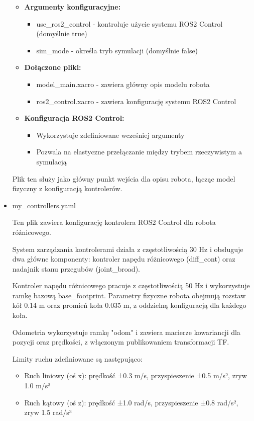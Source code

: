 \documentclass[a4paper,twoside,12pt]{book}
\begin{document}
\begin{itemize}
\begin{itemize}
	\item \textbf{Argumenty konfiguracyjne:}
		\begin{itemize}
		\item use\_ros2\_control - kontroluje użycie systemu ROS2 Control (domyślnie true)
		\item sim\_mode - określa tryb symulacji (domyślnie false)
		\end{itemize}

	\item \textbf{Dołączone pliki:}
		\begin{itemize}
		\item model\_main.xacro - zawiera główny opis modelu robota
		\item ros2\_control.xacro - zawiera konfigurację systemu ROS2 Control
		\end{itemize}

	\item \textbf{Konfiguracja ROS2 Control:}
		\begin{itemize}
		\item Wykorzystuje zdefiniowane wcześniej argumenty
		\item Pozwala na elastyczne przełączanie między trybem rzeczywistym a symulacją
		\end{itemize}
	\end{itemize}

	Plik ten służy jako główny punkt wejścia dla opisu robota, łącząc model fizyczny z konfiguracją kontrolerów.
	\newpage
	\item my\_controllers.yaml
	
	Ten plik zawiera konfigurację kontrolera ROS2 Control dla robota różnicowego. 
	
	System zarządzania kontrolerami działa z częstotliwością 30 Hz i obsługuje dwa główne komponenty: kontroler napędu różnicowego (diff\_cont) oraz nadajnik stanu przegubów (joint\_broad).

	Kontroler napędu różnicowego pracuje z częstotliwością 50 Hz i wykorzystuje ramkę bazową base\_footprint. Parametry fizyczne robota obejmują rozstaw kół 0.14 m oraz promień koła 0.035 m, z oddzielną konfiguracją dla każdego koła.

	Odometria wykorzystuje ramkę "odom" i zawiera macierze kowariancji dla pozycji oraz prędkości, z włączonym publikowaniem transformacji TF.

	Limity ruchu zdefiniowane są następująco:
	\begin{itemize}
		\item Ruch liniowy (oś x): prędkość ±0.3 m/s, przyspieszenie ±0.5 m/s², zryw 1.0 m/s³
		\item Ruch kątowy (oś z): prędkość ±1.0 rad/s, przyspieszenie ±0.8 rad/s², zryw 1.5 rad/s³
	\end{itemize}


\end{itemize}
\end{document}
